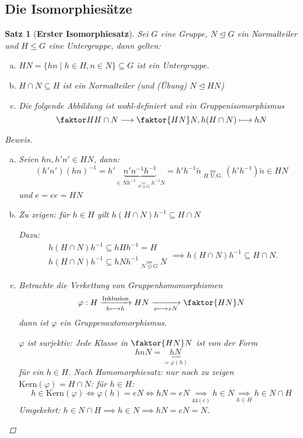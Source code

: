 \documentclass[a4paper]{article}
\theoremstyle{plain}
\newtheorem{satz}[thm]{Satz}
\theoremstyle{definition}
\begin{document}
\subsection*{Die Isomorphiesätze}
\begin{satz}[\textbf{Erster Isomorphiesatz}]
  Sei $G$ eine Gruppe, $N \trianglelefteq G$ ein Normalteiler und $H \le G$ eine Untergruppe, dann gelten:
  \begin{enumerate}[(a)]
    \item $HN = \{hn \mid h \in H, n \in N\} \subseteq G$ ist ein Untergruppe.
    \item $H \cap N \subseteq H$ ist ein Normalteiler (und (Übung) $N \trianglelefteq HN$)
    \item Die folgende Abbildung ist wohl-definiert und ein Gruppenisomorphismus $$\faktor H{H \cap N} \longrightarrow \faktor {HN}N, h(H\cap N) \longmapsto hN$$
  \end{enumerate}
\begin{proof}[Beweis]
\begin{enumerate}[(a)]
  \item Seien $hn, h'n' \in HN$, dann:
        $$(h'n')(hn)^{-1}=h'\underbrace{n'n^{-1}h^{-1}}_{\in Nh^{-1} \underset{N \trianglelefteq G} = h^{-1}N} = h'h^{-1}\tilde n \underset{H \text{ U.G.}}= (h'h^{-1})\tilde n \in HN$$
        und $e = ee = HN$
  \item Zu zeigen: für $h \in H$ gilt $h(H \cap N)h^{-1} \subseteq H \cap N$

        Dazu:
        $$\begin{matrix}
            h (H \cap N)h^{-1} \subseteq hHh^{-1} = H \\
            h (H \cap N)h^{-1} \subseteq hNh^{-1} \underset{N \trianglelefteq G}= N
          \end{matrix} \implies h(H \cap N)h^{-1} \subseteq H \cap N.$$

  \item Betrachte die Verkettung von Gruppenhomomorphismen
        $$\varphi: H \xrightarrow[h \longmapsto h]{\text{Inklusion}} HN \xrightarrow[x \longmapsto xN]{} \faktor{HN}N$$
        dann ist $\varphi$ ein Gruppenautomorphismus.

        $\varphi$ ist surjektiv: Jede Klasse in $\faktor{HN}N$ ist von der Form $$hnN = \underbrace{hN}_{=\varphi(h)}$$
        für ein $h \in H$. Nach Homomorphiesatz: nur noch zu zeigen $\mathrm{Kern}(\varphi) = H \cap N$:
        für $h \in H$: $$h \in \mathrm{Kern}(\varphi) \iff \varphi(h) = eN \iff hN = eN \underset{44(c)}\implies h \in N \underset{h \in H}\implies h \in N \cap H$$
        Umgekehrt: $h \in N \cap H \implies h \in N \implies hN = eN = N$.
\end{enumerate}
\end{proof}
\end{satz}
\end{document}
